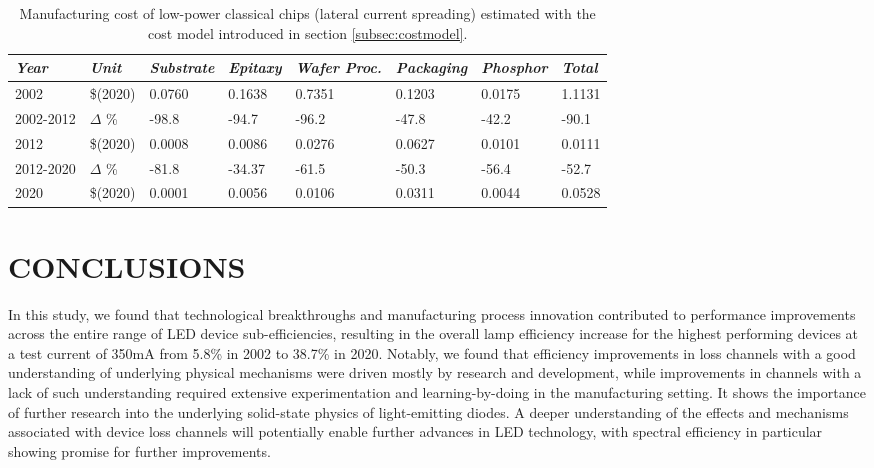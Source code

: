 \documentclass[a4paper,nocompress]{spie}  %
\begin{document}
    \begin{table}[h!]
        \caption{Manufacturing cost of low-power classical chips (lateral current spreading) estimated with the cost model introduced in section \ref{subsec:costmodel}.}
        \bigskip
            \centering
            \begin{tabularx}{\textwidth}{|l|l|X|X|X|X|X|l|}
            	\hline
            		\textit{Year} & \textit{Unit} & \textit{Substrate} & \textit{Epitaxy} & \textit{Wafer Proc.} & \textit{Packaging} & \textit{Phosphor} & \textit{Total} \\
                \hline
                    2002 & \$(2020) & 0.0760 & 0.1638 & 0.7351 & 0.1203 & 0.0175 & 1.1131 \\
                \hline
                    2002-2012 & $\Delta$ \% & -98.8 & -94.7 & -96.2 & -47.8 & -42.2 & -90.1 \\
                \hline
                    2012 & \$(2020) & 0.0008 & 0.0086 & 0.0276 & 0.0627 & 0.0101 & 0.0111 \\
                \hline
                    2012-2020 & $\Delta$ \% & -81.8 & -34.37 & -61.5 & -50.3 & -56.4 & -52.7 \\
                \hline
                    2020 & \$(2020) & 0.0001 & 0.0056 & 0.0106 & 0.0311 & 0.0044 & 0.0528 \\
                \hline
            \end{tabularx}
            \label{tab:cost}
        \end{table}


\section{CONCLUSIONS}

    In this study, we found that technological breakthroughs and manufacturing process innovation contributed to performance improvements across the entire range of LED device sub-efficiencies, resulting in the overall lamp efficiency increase for the highest performing devices at a test current of 350mA from 5.8\% in 2002 to 38.7\% in 2020. Notably, we found that efficiency improvements in loss channels with a good understanding of underlying physical mechanisms were driven mostly by research and development, while improvements in channels with a lack of such understanding required extensive experimentation and learning-by-doing in the manufacturing setting. It shows the importance of further research into the underlying solid-state physics of light-emitting diodes. A deeper understanding of the effects and mechanisms associated with device loss channels will potentially enable further advances in LED technology, with spectral efficiency in particular showing promise for further improvements. 
\end{document}
